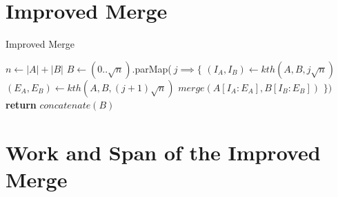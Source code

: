 \section{Improved Merge}

\begin{algorithm}
\caption{Improved Merge}
\begin{algorithmic}[1]

	\State $n \gets |A| + |B|$
	\State $B \gets (0..\sqrt{n})$.parMap($\ j \implies \{$
		\State \qquad $(I_A, I_B) \gets kth(A, B, j\sqrt{n})$
		\State \qquad $(E_A, E_B) \gets kth(A, B, (j+1)\sqrt{n})$
		\State \qquad $merge(A[I_A:E_A], B[I_B:E_B])$
	\State $\})$
	\State \textbf{return} $concatenate(B)$
\EndProcedure

\end{algorithmic}
\end{algorithm}

\section{Work and Span of the Improved Merge}



